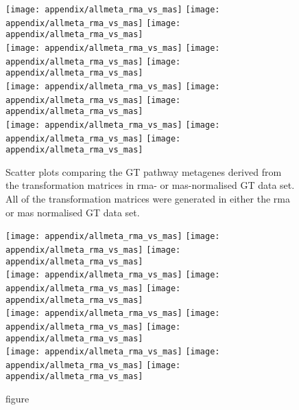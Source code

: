 \begin{appendices}
	\begin{figure}[htp!]
		\centering
		\texttt{[image: appendix/allmeta\_rma\_vs\_mas]}
		\texttt{[image: appendix/allmeta\_rma\_vs\_mas]}
		\texttt{[image: appendix/allmeta\_rma\_vs\_mas]}\\
		\texttt{[image: appendix/allmeta\_rma\_vs\_mas]}
		\texttt{[image: appendix/allmeta\_rma\_vs\_mas]}
		\texttt{[image: appendix/allmeta\_rma\_vs\_mas]}\\
		\texttt{[image: appendix/allmeta\_rma\_vs\_mas]}
		\texttt{[image: appendix/allmeta\_rma\_vs\_mas]}
		\texttt{[image: appendix/allmeta\_rma\_vs\_mas]}\\
		\texttt{[image: appendix/allmeta\_rma\_vs\_mas]}
		\texttt{[image: appendix/allmeta\_rma\_vs\_mas]}
		\texttt{[image: appendix/allmeta\_rma\_vs\_mas]}\\
		\caption[Comparison of the normalisation methods used for the pathway metagene TM and the GT data]{Scatter plots comparing the GT pathway metagenes derived from the transformation matrices in \gls{rma}- or \gls{mas}-normalised GT data set.
		All of the transformation matrices were generated in either the \gls{rma} or \gls{mas} normalised GT data set.
		}
		\label{fig:appendix/gt_meta_rma_mas}
	\end{figure}

	\begin{figure}[htpb]
		\ContinuedFloat
		\captionsetup{list=off,format=cont}
		\centering
		\texttt{[image: appendix/allmeta\_rma\_vs\_mas]}
		\texttt{[image: appendix/allmeta\_rma\_vs\_mas]}
		\texttt{[image: appendix/allmeta\_rma\_vs\_mas]}\\
		\texttt{[image: appendix/allmeta\_rma\_vs\_mas]}
		\texttt{[image: appendix/allmeta\_rma\_vs\_mas]}
		\texttt{[image: appendix/allmeta\_rma\_vs\_mas]}\\
		\texttt{[image: appendix/allmeta\_rma\_vs\_mas]}
		\texttt{[image: appendix/allmeta\_rma\_vs\_mas]}
		\texttt{[image: appendix/allmeta\_rma\_vs\_mas]}\\
		\texttt{[image: appendix/allmeta\_rma\_vs\_mas]}
		\texttt{[image: appendix/allmeta\_rma\_vs\_mas]}
		\texttt{[image: appendix/allmeta\_rma\_vs\_mas]}\\
		\caption[]{figure}
	\end{figure}


\end{appendices}
